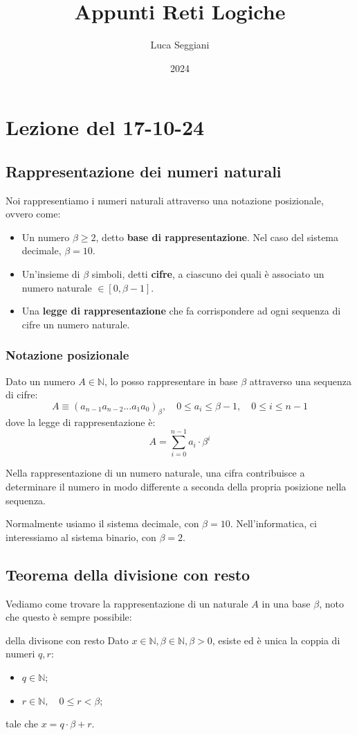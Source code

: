 \documentclass[a4paper,11pt]{article}
\title{Appunti Reti Logiche}
\author{Luca Seggiani}
\date{2024}
\begin{document}
\section{Lezione del 17-10-24}

\thispagestyle{empty}
\pagestyle{fancy}

\subsection{Rappresentazione dei numeri naturali}
Noi rappresentiamo i numeri naturali attraverso una notazione posizionale, ovvero come:
\begin{itemize}
	\item Un numero $\beta \geq 2$, detto \textbf{base di rappresentazione}. Nel caso del sistema decimale, $\beta = 10$.
	\item Un'insieme di $\beta$ simboli, detti \textbf{cifre}, a ciascuno dei quali è associato un numero naturale $\in [0, \beta - 1]$.
	\item Una \textbf{legge di rappresentazione} che fa corrispondere ad ogni sequenza di cifre un numero naturale.
\end{itemize}

\subsubsection{Notazione posizionale}
Dato un numero $A \in \mathbb{N}$, lo posso rappresentare in base $\beta$ attraverso una sequenza di cifre:
$$ A \equiv (a_{n-1}a_{n-2} ... a_1 a_0)_\beta, \quad 0 \leq a_i \leq \beta - 1, \quad 0 \leq i \leq n - 1 $$
dove la legge di rappresentazione è:
$$
A = \sum_{i=0}^{n-1} a_i \cdot \beta^i
$$

Nella rappresentazione di un numero naturale, una cifra contribuisce a determinare il numero in modo differente a seconda della propria posizione nella sequenza.

Normalmente usiamo il sistema decimale, con $\beta = 10$. Nell'informatica, ci interessiamo al sistema binario, con $\beta = 2$.

\subsection{Teorema della divisione con resto}
Vediamo come trovare la rappresentazione di un naturale $A$ in una base $\beta$, noto che questo è sempre possibile:
\begin{theorem}{della divisone con resto}
	Dato $x \in \mathbb{N}, \beta \in \mathbb{N}, \beta > 0$, esiste ed è unica la coppia di numeri $q,r$:
	\begin{itemize}
		\item $q \in \mathbb{N}$;
		\item $r \in \mathbb{N}, \quad 0 \leq r < \beta$;
	\end{itemize}
	tale che $x = q \cdot \beta + r$.
\end{theorem}
\end{document}
